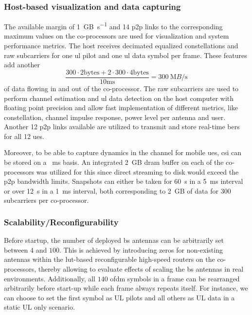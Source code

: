 \documentclass[journal]{IEEEtran}
\begin{document}
\subsubsection{Host-based visualization and data capturing} 
%
The available margin of \SI{1}{\giga B\per\second} and 14 \gls{p2p} links to the corresponding maximum values on the co-processors are used for visualization and system performance metrics.
The host receives decimated equalized constellations and raw subcarriers for one \gls{ul} pilot and one \gls{ul} data symbol per frame.
These features add another 
\begin{equation}
\frac{300\cdot 2\text{bytes}+2\cdot 300\cdot 4\text{bytes}}{\num{10}\text{ms}}=\SI{300}{\mega B\per\second}\nonumber
\end{equation}
of data flowing in and out of the co-processor.
The raw subcarriers are used to perform channel estimation and \gls{ul} data detection on the host computer with floating point precision and allow fast implementation of different metrics, like constellation, channel impulse response, power level per antenna and user.
%
Another 12 \gls{p2p} links available are utilized to transmit and store real-time \glspl{ber} for all 12 \glspl{ue}.

Moreover, to be able to capture dynamics in the channel for mobile \glspl{ue}, \gls{csi} can be stored on a \SI{}{\milli\second} basis.
An integrated \SI{2}{\giga B} \gls{dram} buffer on each of the co-processors was utilized for this since direct streaming to disk would exceed the \gls{p2p} bandwidth limits.
Snapshots can either be taken for \SI{60}{\second} in a \SI{5}{\milli\second} interval or over \SI{12}{\second} in a \SI{1}{\milli\second} interval, both corresponding to \SI{2}{\giga B} of data for $300$ subcarriers per co-processor.
%
\subsubsection{Scalability/Reconfigurability}
Before startup, the number of deployed \gls{bs} antennas can be arbitrarily set between $4$ and $100$.
This is achieved by introducing zeros for non-existing antennas within the \gls{lut}-based reconfigurable high-speed routers on the co-processors, thereby allowing to evaluate effects of scaling the \gls{bs} antennas in real environments\cite{sips_steffen}.
Additionally, all $140$ \gls{ofdm} symbols in a frame can be rearranged arbitrarily before start-up while each frame always repeats itself.
For instance, we can choose to set the first symbol as UL pilots and all others as UL data in a static UL only scenario.
%
\end{document}
